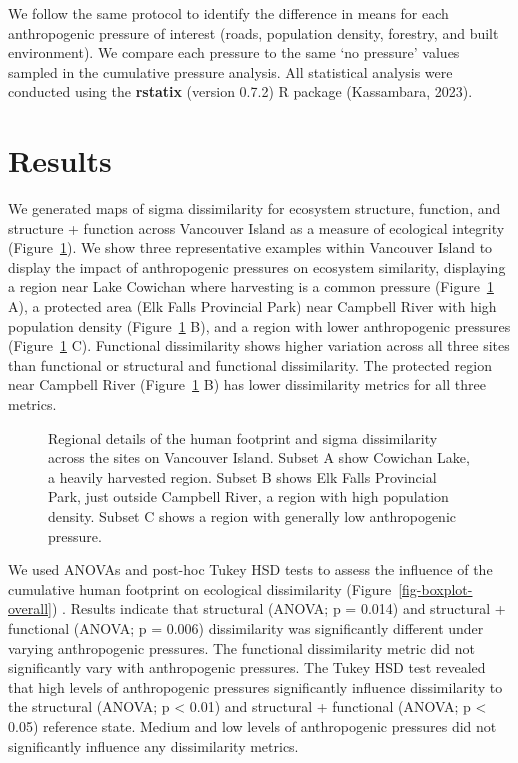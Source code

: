 \documentclass[
]{agujournal2019}
\begin{document}
We follow the same protocol to identify the difference in means for each
anthropogenic pressure of interest (roads, population density, forestry,
and built environment). We compare each pressure to the same `no
pressure' values sampled in the cumulative pressure analysis. All
statistical analysis were conducted using the \textbf{rstatix} (version
0.7.2) R package (Kassambara, 2023).

\section{Results}\label{results}

We generated maps of sigma dissimilarity for ecosystem structure,
function, and structure + function across Vancouver Island as a measure
of ecological integrity (Figure~\ref{fig-regional}). We show three
representative examples within Vancouver Island to display the impact of
anthropogenic pressures on ecosystem similarity, displaying a region
near Lake Cowichan where harvesting is a common pressure
(Figure~\ref{fig-regional} A), a protected area (Elk Falls Provincial
Park) near Campbell River with high population density
(Figure~\ref{fig-regional} B), and a region with lower anthropogenic
pressures (Figure~\ref{fig-regional} C). Functional dissimilarity shows
higher variation across all three sites than functional or structural
and functional dissimilarity. The protected region near Campbell River
(Figure~\ref{fig-regional} B) has lower dissimilarity metrics for all
three metrics.

\label{cell-fig-regional}
\begin{figure}[H]


\caption{\label{fig-regional}Regional details of the human footprint and
sigma dissimilarity across the sites on Vancouver Island. Subset A show
Cowichan Lake, a heavily harvested region. Subset B shows Elk Falls
Provincial Park, just outside Campbell River, a region with high
population density. Subset C shows a region with generally low
anthropogenic pressure.}

\end{figure}%

We used ANOVAs and post-hoc Tukey HSD tests to assess the influence of
the cumulative human footprint on ecological dissimilarity
(Figure~\ref{fig-boxplot-overall}) . Results indicate that structural
(ANOVA; p = 0.014) and structural + functional (ANOVA; p = 0.006)
dissimilarity was significantly different under varying anthropogenic
pressures. The functional dissimilarity metric did not significantly
vary with anthropogenic pressures. The Tukey HSD test revealed that high
levels of anthropogenic pressures significantly influence dissimilarity
to the structural (ANOVA; p \textless{} 0.01) and structural +
functional (ANOVA; p \textless{} 0.05) reference state. Medium and low
levels of anthropogenic pressures did not significantly influence any
dissimilarity metrics.
\end{document}
